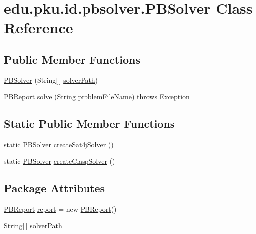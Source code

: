 \hypertarget{classedu_1_1pku_1_1id_1_1pbsolver_1_1_p_b_solver}{
\section{edu.pku.id.pbsolver.PBSolver Class Reference}
\label{classedu_1_1pku_1_1id_1_1pbsolver_1_1_p_b_solver}
}
\subsection*{Public Member Functions}
\begin{DoxyCompactItemize}
\item 
\hyperlink{classedu_1_1pku_1_1id_1_1pbsolver_1_1_p_b_solver_a130e631ded47abd2267a4205701c0b27}{PBSolver} (String\mbox{[}$\,$\mbox{]} \hyperlink{classedu_1_1pku_1_1id_1_1pbsolver_1_1_p_b_solver_a2bf17e40556100fe37c06b64e626ad7b}{solverPath})
\item 
\hyperlink{classedu_1_1pku_1_1id_1_1pbsolver_1_1_p_b_report}{PBReport} \hyperlink{classedu_1_1pku_1_1id_1_1pbsolver_1_1_p_b_solver_abf1dd338dbd3ae6e9fd5770409641ca0}{solve} (String problemFileName)  throws Exception 
\end{DoxyCompactItemize}
\subsection*{Static Public Member Functions}
\begin{DoxyCompactItemize}
\item 
static \hyperlink{classedu_1_1pku_1_1id_1_1pbsolver_1_1_p_b_solver}{PBSolver} \hyperlink{classedu_1_1pku_1_1id_1_1pbsolver_1_1_p_b_solver_ac68507144bb71b64c8959c5ae872797f}{createSat4jSolver} ()
\item 
static \hyperlink{classedu_1_1pku_1_1id_1_1pbsolver_1_1_p_b_solver}{PBSolver} \hyperlink{classedu_1_1pku_1_1id_1_1pbsolver_1_1_p_b_solver_a060d503fb76dfc3407baface7a6a6e1e}{createClaspSolver} ()
\end{DoxyCompactItemize}
\subsection*{Package Attributes}
\begin{DoxyCompactItemize}
\item 
\hyperlink{classedu_1_1pku_1_1id_1_1pbsolver_1_1_p_b_report}{PBReport} \hyperlink{classedu_1_1pku_1_1id_1_1pbsolver_1_1_p_b_solver_afc826fd90f34a98b4008e0a5aabad686}{report} = new \hyperlink{classedu_1_1pku_1_1id_1_1pbsolver_1_1_p_b_report}{PBReport}()
\item 
String\mbox{[}$\,$\mbox{]} \hyperlink{classedu_1_1pku_1_1id_1_1pbsolver_1_1_p_b_solver_a2bf17e40556100fe37c06b64e626ad7b}{solverPath}
\end{DoxyCompactItemize}
